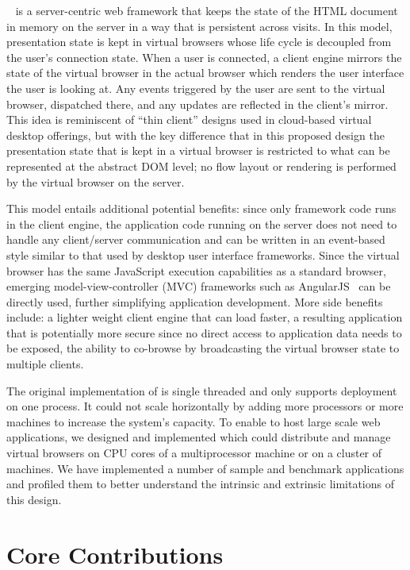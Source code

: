 \cb{}~\cite{mcdaniel2012cloudbrowser} is a server-centric web framework 
that keeps the state of the HTML document in memory 
on the server in a way that is persistent across visits.
In this model, presentation state is kept in virtual browsers whose life
cycle is decoupled from the user's connection state.  When a user is connected,
a client engine mirrors the state of the virtual browser in the actual browser which
renders the user interface the user is looking at.  Any events triggered by the
user are sent to the virtual browser, dispatched there, and any updates
are reflected in the client's mirror.  This idea is reminiscent of 
``thin client'' designs used in cloud-based virtual desktop offerings,
but with the key difference that in this proposed design the presentation state
that is kept in a virtual browser is restricted to what can be represented at the
abstract DOM level; no flow layout or rendering is performed by the virtual browser on the 
server.

This model entails additional potential benefits: since only framework code runs in
the client engine, the application code running on the server does not need
to handle any client/server communication and can be written in an event-based
style similar to that used by desktop user interface frameworks.
Since the virtual browser has the same JavaScript execution capabilities as a
standard browser, emerging model-view-controller (MVC) frameworks such as 
AngularJS~\cite{hevery2009angular} can be directly used, further simplifying application development.
More side benefits include: a lighter weight client engine that can load faster,
a resulting application that is potentially more secure since no direct access to
application data needs to be exposed, the ability to co-browse by broadcasting
the virtual browser state to multiple clients.

The original implementation of \cb{} is single threaded and
only supports deployment on one process.
It could not scale horizontally by adding more processors or more machines
to increase the system's capacity.
To enable \cb{} to host large scale web applications,
we designed and implemented \cbtwo which could distribute and manage
virtual browsers on CPU cores of a multiprocessor machine or on a cluster of machines.
We have implemented a number of sample and benchmark
applications and profiled them to better understand the intrinsic and extrinsic
limitations of this design.



\section{Core Contributions}

